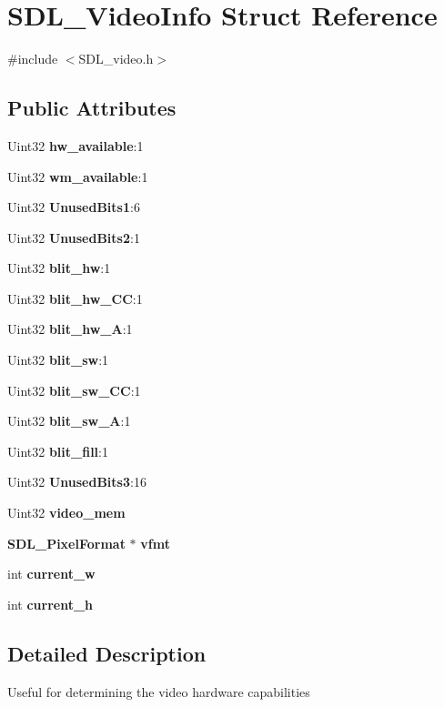 \section{S\+D\+L\+\_\+\+Video\+Info Struct Reference}
\label{struct_s_d_l___video_info}


{\ttfamily \#include $<$S\+D\+L\+\_\+video.\+h$>$}

\subsection*{Public Attributes}
\begin{DoxyCompactItemize}
\item 
Uint32 {\bf hw\+\_\+available}\+:1
\item 
Uint32 {\bf wm\+\_\+available}\+:1
\item 
Uint32 {\bfseries Unused\+Bits1}\+:6\label{struct_s_d_l___video_info_a1aeb1f930953b9d32a56f978047b5f27}

\item 
Uint32 {\bfseries Unused\+Bits2}\+:1\label{struct_s_d_l___video_info_add1b831a063c0a4aed3f2f496096374b}

\item 
Uint32 {\bf blit\+\_\+hw}\+:1
\item 
Uint32 {\bf blit\+\_\+hw\+\_\+\+C\+C}\+:1
\item 
Uint32 {\bf blit\+\_\+hw\+\_\+\+A}\+:1
\item 
Uint32 {\bf blit\+\_\+sw}\+:1
\item 
Uint32 {\bf blit\+\_\+sw\+\_\+\+C\+C}\+:1
\item 
Uint32 {\bf blit\+\_\+sw\+\_\+\+A}\+:1
\item 
Uint32 {\bf blit\+\_\+fill}\+:1
\item 
Uint32 {\bfseries Unused\+Bits3}\+:16\label{struct_s_d_l___video_info_a647dc6f87a620ac1f4d7075a0f7063c7}

\item 
Uint32 {\bf video\+\_\+mem}
\item 
{\bf S\+D\+L\+\_\+\+Pixel\+Format} $\ast$ {\bf vfmt}
\item 
int {\bf current\+\_\+w}
\item 
int {\bf current\+\_\+h}
\end{DoxyCompactItemize}


\subsection{Detailed Description}
Useful for determining the video hardware capabilities 

